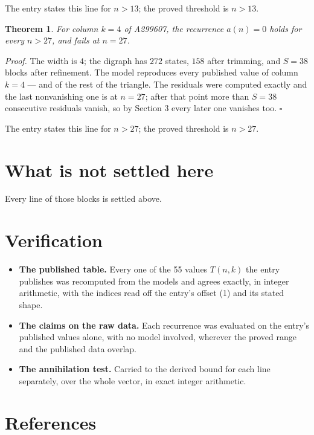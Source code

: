 \documentclass[11pt]{article}
\newtheorem{theorem}{Theorem}
\theoremstyle{definition}
\begin{document}
The entry states this line for $n > 13$; the proved threshold is $n > 13$.

\begin{theorem} For column $k = 4$ of A299607, the recurrence $a(n) = 0$ holds for every $n > 27$, and fails at $n = 27$.\end{theorem}

{\itshape Proof.} The width is $4$; the digraph has $272$ states, $158$ after trimming, and $S = 38$ blocks after refinement. The model reproduces every published value of column $k = 4$ --- and of the rest of the triangle. The residuals were computed exactly and the last nonvanishing one is at $n = 27$; after that point more than $S = 38$ consecutive residuals vanish, so by Section 3 every later one vanishes too. $\square$

The entry states this line for $n > 27$; the proved threshold is $n > 27$.

\section{What is not settled here}

Every line of those blocks is settled above.

\section{Verification}

\begin{itemize}

\item {\bfseries The published table.} Every one of the 55 values $T(n,k)$ the entry publishes was recomputed from the models and agrees exactly, in integer arithmetic, with the indices read off the entry's offset (1) and its stated shape.

\item {\bfseries The claims on the raw data.} Each recurrence was evaluated on the entry's published values alone, with no model involved, wherever the proved range and the published data overlap.

\item {\bfseries The annihilation test.} Carried to the derived bound for each line separately, over the whole vector, in exact integer arithmetic.

\end{itemize}

\section{References}
\end{document}
